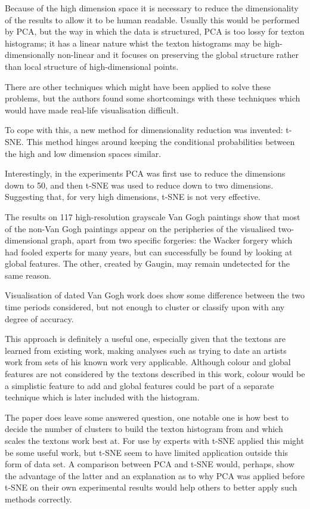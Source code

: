 \documentclass[conference]{IEEEtran}
\begin{document}
Because of the high dimension space it is necessary to reduce the
dimensionality of the results to allow it to be human readable. Usually this
would be performed by \gls{PCA}, but the way in which the data is structured,
\gls{PCA} is too lossy for texton histograms; it has a linear nature whist the
texton histograms may be high-dimensionally non-linear and it focuses on
preserving the global structure rather than local structure of high-dimensional
points.

There are other techniques which might have been applied to solve these
problems, but the authors found some shortcomings with these techniques which
would have made real-life visualisation difficult.

To cope with this, a new method for dimensionality reduction was invented:
\gls{t-SNE}. This method hinges around keeping
the conditional probabilities between the high and low dimension spaces
similar.

Interestingly, in the experiments \gls{PCA} was first use to reduce the
dimensions down to 50, and then \gls{t-SNE} was
used to reduce down to two dimensions. Suggesting that, for very high dimensions,
\gls{t-SNE} is not very effective.

The results on 117 high-resolution grayscale Van Gogh paintings show that most
of the non-Van Gogh paintings appear on the peripheries of the visualised
two-dimensional graph, apart from two specific forgeries: the Wacker forgery
which had fooled experts for many years, but can successfully be found by
looking at global features. The other, created by Gaugin, may remain undetected
for the same reason.

Visualisation of dated Van Gogh work does show some difference between the two
time periods considered, but not enough to cluster or classify upon with any
degree of accuracy.


This approach is definitely a useful one, especially given that the textons are
learned from existing work, making analyses such as trying to date an artists
work from sets of his known work very applicable. Although colour and global
features are not considered by the textons described in this work, colour would
be a simplistic feature to add and global features could be part of a separate
technique which is later included with the histogram.

The paper does leave some answered question, one notable one is how best to
decide the number of clusters to build the texton histogram from and which
scales the textons work best at. For use by experts with \gls{t-SNE} applied
this might be some useful work, but \gls{t-SNE} seem to have limited
application outside this form of data set. A comparison between \gls{PCA} and
\gls{t-SNE} would, perhaps, show the advantage of the latter and an explanation
as to why \gls{PCA} was applied before \gls{t-SNE} on their own experimental
results would help others to better apply such methods correctly.
\end{document}
